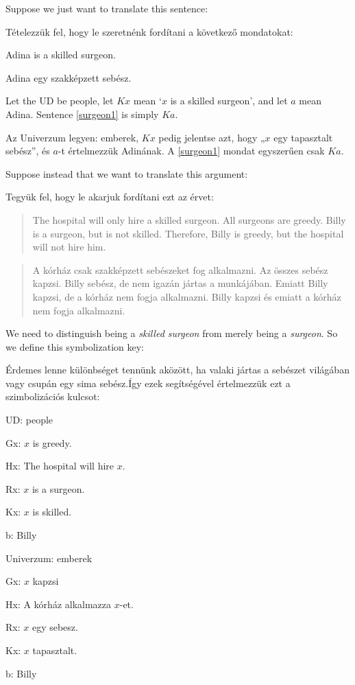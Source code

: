 Suppose we just want to translate this sentence:

Tételezzük fel, hogy le szeretnénk fordítani a következő mondatokat:
\begin{earg}
\item[\ex{surgeon1}] Adina is a skilled surgeon.
\end{earg}
\begin{earg}
\item[\ex{surgeon1}] Adina egy szakképzett sebész.
\end{earg}
Let the UD be people, let $Kx$ mean `$x$ is a skilled surgeon', and let $a$ mean Adina. Sentence \ref{surgeon1} is simply $Ka$.

Az Univerzum legyen: emberek, $Kx$ pedig jelentse azt, hogy „$x$ egy tapasztalt sebész”, és $a$-t értelmezzük Adinának. A \ref{surgeon1} mondat egyszerűen csak $Ka$.

Suppose instead that we want to translate this argument:

Tegyük fel, hogy le akarjuk fordítani ezt az érvet:
\begin{quote}
The hospital will only hire a skilled surgeon. All surgeons are greedy. Billy is a surgeon, but is not skilled. Therefore, Billy is greedy, but the hospital will not hire him.
\end{quote}
\begin{quote}
A kórház csak szakképzett sebészeket fog alkalmazni. Az összes sebész kapzsi. Billy sebész, de nem igazán jártas a munkájában. Emiatt Billy kapzsi, de a kórház nem fogja alkalmazni. Billy kapzsi és emiatt a kórház nem fogja alkalmazni. 
\end{quote}
We need to distinguish being a \emph{skilled surgeon} from merely being a \emph{surgeon}. So we define this symbolization key:

Érdemes lenne különbséget tennünk aközött, ha valaki jártas a sebészet világában vagy csupán egy sima sebész.Így ezek segítségével értelmezzük ezt a szimbolizációs kulcsot:
\begin{ekey}
\item[UD:] people
\item[Gx:] $x$ is greedy.
\item[Hx:] The hospital will hire $x$.
\item[Rx:] $x$ is a surgeon.
\item[Kx:] $x$ is skilled.
\item[b:] Billy
\end{ekey}

\begin{ekey}
\item[Univerzum:] emberek
\item[Gx:] $x$ kapzsi
\item[Hx:] A kórház alkalmazza $x$-et.
\item[Rx:] $x$ egy sebesz.
\item[Kx:] $x$ tapasztalt.
\item[b:] Billy
\end{ekey}

